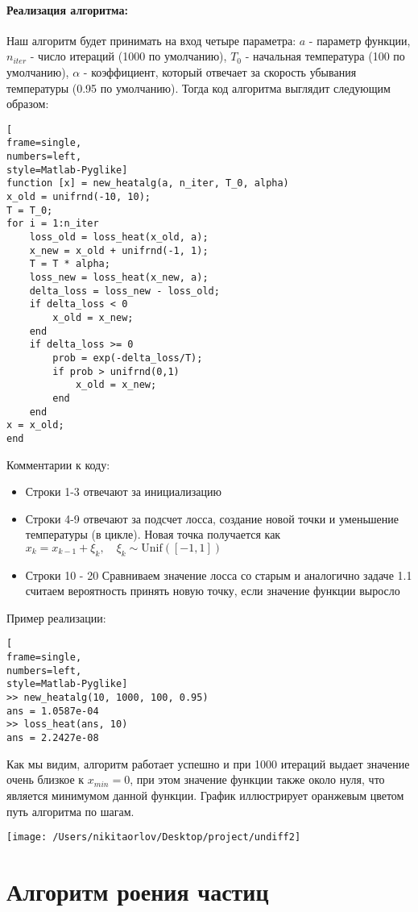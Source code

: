 \documentclass[12pt]{article}
\begin{document}
\paragraph{Реализация алгоритма:}
Наш алгоритм будет принимать на вход четыре параметра: $a$ - параметр функции, $n_{iter}$ - число итераций (1000 по умолчанию), $T_0$ - начальная температура (100 по умолчанию), $\alpha$ - коэффициент, который отвечает за скорость убывания температуры (0.95 по умолчанию). Тогда код алгоритма выглядит следующим образом:
\begin{lstlisting}[
frame=single,
numbers=left,
style=Matlab-Pyglike]
function [x] = new_heatalg(a, n_iter, T_0, alpha)
x_old = unifrnd(-10, 10);
T = T_0;
for i = 1:n_iter
    loss_old = loss_heat(x_old, a);
    x_new = x_old + unifrnd(-1, 1);
    T = T * alpha;
    loss_new = loss_heat(x_new, a);
    delta_loss = loss_new - loss_old;
    if delta_loss < 0
        x_old = x_new;
    end
    if delta_loss >= 0
        prob = exp(-delta_loss/T);
        if prob > unifrnd(0,1)
            x_old = x_new;
        end
    end
x = x_old;
end
\end{lstlisting}
Комментарии к коду: 
\begin{itemize}
	\item Строки 1-3 отвечают за инициализацию
	\item Строки 4-9 отвечают за подсчет лосса, создание новой точки и уменьшение температуры (в цикле). Новая точка получается как $x_{k} = x_{k-1} + \xi_k, \quad \xi_k \sim \mathrm{Unif}([-1, 1])$
	\item Строки 10 - 20 Сравниваем значение лосса со старым и аналогично задаче 1.1 считаем вероятность принять новую точку, если значение функции выросло
\end{itemize}
Пример реализации:
\begin{lstlisting}[
frame=single,
numbers=left,
style=Matlab-Pyglike]
>> new_heatalg(10, 1000, 100, 0.95)
ans = 1.0587e-04
>> loss_heat(ans, 10)
ans = 2.2427e-08
\end{lstlisting}
Как мы видим, алгоритм работает успешно и при 1000 итераций выдает значение очень близкое к $x_{min} = 0$, при этом значение функции также около нуля, что является минимумом данной функции. График иллюстрирует оранжевым цветом путь алгоритма по шагам.
 \begin{center}
  		\texttt{[image: /Users/nikitaorlov/Desktop/project/undiff2]}
\end{center}
\section{Алгоритм роения частиц}
\end{document}

